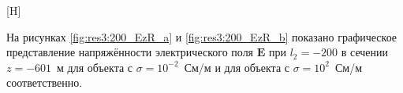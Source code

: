 \documentclass[a4paper,14pt]{article}
\makeatletter
\renewenvironment{figure}[1][\fps@figure]{
  \edef\@tempa{\noexpand\@float{figure}[#1]}
  \@tempa
  \addtocounter{foofigure}{1}
}{
  \end@float
}
\renewcommand{\Re}{\mathop{\mathrm{Re}}\nolimits}
\makeatother
\begin{document}
\begin{figure}[H]
	\centering
	\text{~~}
	\caption{векторы $(\Re(\mathbf{E}_x), \Re{\mathbf{E}_z})^T$, изолинии $\Re(\mathbf{E}_y)$ при $l_2=-200$}
	\label{fig:res3:200_vec}
\end{figure}

На рисунках \ref{fig:res3:200_EzR_a} и \ref{fig:res3:200_EzR_b} показано графическое представление напряжённости электрического поля $\mathbf{E}$ при $l_2=-200$ в сечении $z=-601$~м для объекта с $\sigma=10^{-2}$~См/м и для объекта с $\sigma=10^{2}$~См/м соответственно.
\end{document}
